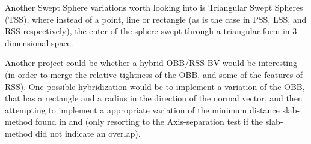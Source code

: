 Another Swept Sphere variations worth looking into is Triangular Swept Spheres (TSS), where instead of a point, line or rectangle (as is the case in PSS, LSS, and RSS respectively), the enter of the sphere swept through a triangular form in 3 dimensional space. 

Another project could be whether a hybrid OBB/RSS BV would be interesting (in order to merge the relative tightness of the OBB, and some of the features of RSS). One possible hybridization would be to implement a variation of the OBB, that has a rectangle and a radius in the direction of the normal vector, and then attempting to implement a appropriate variation of the minimum distance slab-method found in \cite{larsen00fast} and \cite{Larsen99fastproximity} (only resorting to the Axis-separation test if the slab-method did not indicate an overlap).
